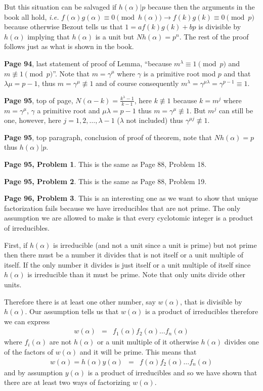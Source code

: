 \documentclass[aps,preprint,preprintnumbers,nofootinbib,showpacs,prd]{revtex4-1}
\newcommand{\ie}{{\it i.e.} }
\newcommand{\nbea}{\begin{eqnarray*}}
\newcommand{\neea}{\end{eqnarray*}}
\begin{document}
But this situation can be salvaged if $h(\alpha)|p$ because then the arguments in the book all hold, \ie $f(\alpha)g(\alpha) \equiv 0 \pmod{h(\alpha)} \to f(k)g(k) \equiv 0 \pmod{p}$ because otherwise Bezout tells us that $1 = af(k)g(k) + bp$ is divisible by $h(\alpha)$ implying that $h(\alpha)$ is a unit but $Nh(\alpha) = p^n$. The rest of the proof follows just as what is shown in the book.

{\bf Page 94}, last statement of proof of Lemma, ``because $m^\lambda \equiv 1 \pmod{p}$ and $m\not\equiv 1 \pmod{p}$''. Note that $m = \gamma^\mu$ where $\gamma$ is a primitive root mod $p$ and that $\lambda\mu = p - 1$, thus $m = \gamma^\mu \not\equiv 1$ and of course consequently $m^\lambda = \gamma^{\mu\lambda} = \gamma^{p-1} \equiv 1$.

{\bf Page 95}, top of page, $N(\alpha - k) = \frac{k^\lambda - 1}{k-1}$, here $k \not \equiv 1$ because $k = m^j$ where $m = \gamma^\mu$, $\gamma$ a primitive root and $\mu\lambda = p-1$ thus $m = \gamma^\mu \not\equiv 1$. But $m^j$ can still be one, however, here $j = 1,2,\dots,\lambda - 1$ ($\lambda$ not included) thus $\gamma^{\mu j} \not\equiv 1$.

{\bf Page 95}, top paragraph, conclusion of proof of theorem, note that $Nh(\alpha) = p$ thus $h(\alpha)|p$.

{\bf Page 95, Problem 1}. This is the same as Page 88, Problem 18.

{\bf Page 95, Problem 2}. This is the same as Page 88, Problem 19.

{\bf Page 96, Problem 3}. This is an interesting one as we want to show that unique factorization fails because we have irreducibles that are not prime. The only assumption we are allowed to make is that every cyclotomic integer is a product of irreducibles.

First, if $h(\alpha)$ is irreducible (and not a unit since a unit is prime) but not prime then there must be a number it divides that is not itself or a unit multiple of itself. If the only number it divides is just itself or a unit multiple of itself since $h(\alpha)$ is irreducible than it must be prime. Note that only units divide other units.

Therefore there is at least one other number, say $w(\alpha)$, that is divisible by $h(\alpha)$. Our assumption tells us that $w(\alpha)$ is a product of irreducibles therefore we can express
%
\nbea
w(\alpha) & = & f_1(\alpha) f_2(\alpha) \dots f_n(\alpha)
\neea
%
where $f_i(\alpha)$ are not $h(\alpha)$ or a unit multiple of it otherwise $h(\alpha)$ divides one of the factors of $w(\alpha)$ and it will be prime. This means that
%
\nbea
w(\alpha) = h(\alpha)y(\alpha) & = & f(\alpha) f_2(\alpha) \dots f_n(\alpha)
\neea
%
and by assumption $y(\alpha)$ is a product of irreducibles and so we have shown that there are at least two ways of factorizing $w(\alpha)$.
\end{document}
